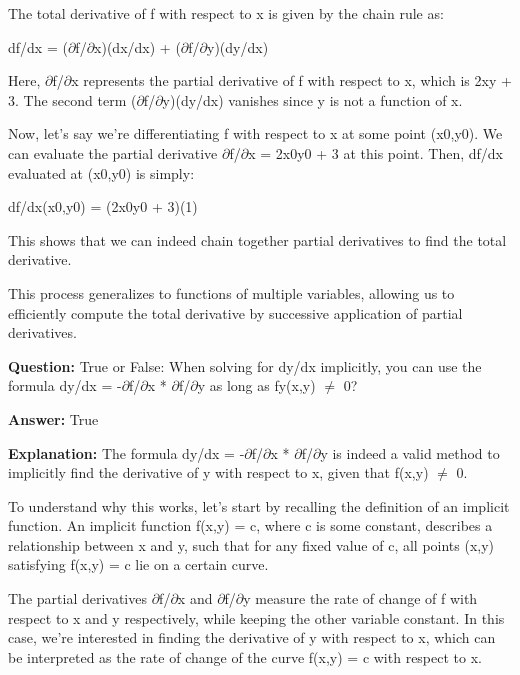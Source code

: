 \documentclass{article}
\begin{document}
The total derivative of f with respect to x is given by the chain rule as:

df/dx = (\ensuremath{\partial}f/\ensuremath{\partial}x)(dx/dx) + (\ensuremath{\partial}f/\ensuremath{\partial}y)(dy/dx)

Here, \ensuremath{\partial}f/\ensuremath{\partial}x represents the partial derivative of f with respect to x, which is 2xy + 3. The second term (\ensuremath{\partial}f/\ensuremath{\partial}y)(dy/dx) vanishes since y is not a function of x.

Now, let's say we're differentiating f with respect to x at some point (x0,y0). We can evaluate the partial derivative \ensuremath{\partial}f/\ensuremath{\partial}x = 2x0y0 + 3 at this point. Then, df/dx evaluated at (x0,y0) is simply:

df/dx(x0,y0) = (2x0y0 + 3)(1)

This shows that we can indeed chain together partial derivatives to find the total derivative.

This process generalizes to functions of multiple variables, allowing us to efficiently compute the total derivative by successive application of partial derivatives.
                
                \vspace{0.5cm} 
        
            
                \textbf {Question:} True or False: When solving for dy/dx implicitly, you can use the formula dy/dx = -\ensuremath{\partial}f/\ensuremath{\partial}x * \ensuremath{\partial}f/\ensuremath{\partial}y as long as fy(x,y) \ensuremath{\neq} 0?
                
                \textbf{Answer:} True

                \textbf{Explanation:} The formula dy/dx = -\ensuremath{\partial}f/\ensuremath{\partial}x * \ensuremath{\partial}f/\ensuremath{\partial}y is indeed a valid method to implicitly find the derivative of y with respect to x, given that f(x,y) \ensuremath{\neq} 0.

To understand why this works, let's start by recalling the definition of an implicit function. An implicit function f(x,y) = c, where c is some constant, describes a relationship between x and y, such that for any fixed value of c, all points (x,y) satisfying f(x,y) = c lie on a certain curve.

The partial derivatives \ensuremath{\partial}f/\ensuremath{\partial}x and \ensuremath{\partial}f/\ensuremath{\partial}y measure the rate of change of f with respect to x and y respectively, while keeping the other variable constant. In this case, we're interested in finding the derivative of y with respect to x, which can be interpreted as the rate of change of the curve f(x,y) = c with respect to x.
\end{document}
